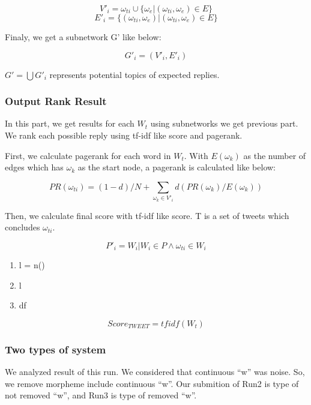 \documentclass{sig-alternate}
\begin{document}
\[V'_{i} = \omega_{ti} \cup \{\omega_{e} |  (\omega_{ti}, \omega_{e}) \in E\}\]
\[E'_{i} = \{(\omega_{ti}, \omega_{e}) | (\omega_{ti}, \omega_{e}) \in E\} \]

Finaly, we get a subnetwork G' like below:

\[G'_{i} = (V'_{i}, E'_{i})\]

\(G' = \bigcup G'_{i}\) represents potential topics of expected replies.

\subsubsection{Output Rank Result}
In this part, we get results for each $W_{t}$ using subnetworks we get previous part. We rank each possible reply using tf-idf like score and pagerank.

First, we calculate pagerank for each word in $W_{t}$. With $E(\omega_{k})$ as the number of edges which has $\omega_{k}$ as the start node, a pagerank is calculated like below:

\[PR(\omega_{ti}) = (1-d)/N + \sum_{\omega_{k}\in V'_{i}} d(PR(\omega_{k})/E(\omega_{k}))\]

Then, we calculate final score with tf-idf like score. T is a set of tweets which concludes $\omega_{ti}$. 

\[P'_{i} = {W_{i} | W_{i} \in P \wedge \omega_{ti} \in W_{i}}\]

\begin{enumerate}
    \item l = n()
    \item l
    \item df
\end{enumerate}

\[Score_{TWEET} = tfidf(W_{t})\]


\subsubsection{Two types of system}
  We analyzed result of this run. We considered that continuous ``w'' was noise. So, we remove morpheme include continuous ``w''.
  Our submition of Run2 is type of not removed ``w'', and Run3 is type of removed ``w''.




\end{document}
